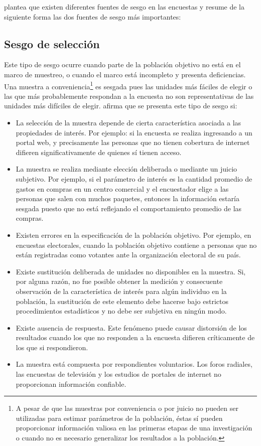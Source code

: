 \documentclass[
  12pt,
  spanish,
]{book}
\providecommand{\tightlist}{%
  \setlength{\itemsep}{0pt}\setlength{\parskip}{0pt}}
\begin{document}
\citet{Gutierrez_2016} plantea que existen diferentes fuentes de sesgo en las encuestas y resume de la siguiente forma las dos fuentes de sesgo más importantes:

\hypertarget{sesgo-de-selecciuxf3n}{%
\subsection*{Sesgo de selección}\label{sesgo-de-selecciuxf3n}}

Este tipo de sesgo ocurre cuando parte de la población objetivo no está en el marco de muestreo, o cuando el marco está incompleto y presenta deficiencias. Una muestra a conveniencia\footnote{A pesar de que las muestras por conveniencia o por juicio no pueden ser utilizadas para estimar parámetros de la población, éstas sí pueden proporcionar información valiosa en las primeras etapas de una investigación o cuando no es necesario generalizar los resultados a la población.} es sesgada pues las unidades más fáciles de elegir o las que más probablemente respondan a la encuesta no son representativas de las unidades más difíciles de elegir. \citet{Loh} afirma que se presenta este tipo de sesgo si:

\begin{itemize}
\tightlist
\item
  La selección de la muestra depende de cierta característica asociada a las propiedades de interés. Por ejemplo: si la encuesta se realiza ingresando a un portal web, y precisamente las personas que no tienen cobertura de internet difieren significativamente de quienes sí tienen acceso.
\item
  La muestra se realiza mediante elección deliberada o mediante un juicio subjetivo. Por ejemplo, si el parámetro de interés es la cantidad promedio de gastos en compras en un centro comercial y el encuestador elige a las personas que salen con muchos paquetes, entonces la información estaría sesgada puesto que no está reflejando el comportamiento promedio de las compras.
\item
  Existen errores en la especificación de la población objetivo. Por ejemplo, en encuestas electorales, cuando la población objetivo contiene a personas que no están registradas como votantes ante la organización electoral de su país.
\item
  Existe sustitución deliberada de unidades no disponibles en la muestra. Si, por alguna razón, no fue posible obtener la medición y consecuente observación de la característica de interés para algún individuo en la población, la sustitución de este elemento debe hacerse bajo estrictos procedimientos estadísticos y no debe ser subjetiva en ningún modo.
\item
  Existe ausencia de respuesta. Este fenómeno puede causar distorsión de los resultados cuando los que no responden a la encuesta difieren críticamente de los que si respondieron.
\item
  La muestra está compuesta por respondientes voluntarios. Los foros radiales, las encuestas de televisión y los estudios de portales de internet no proporcionan información confiable.
\end{itemize}
\end{document}
